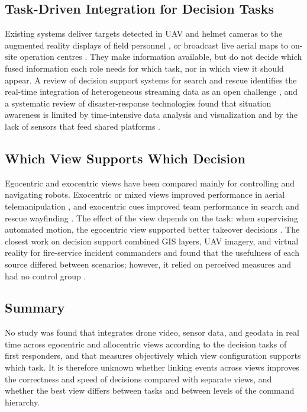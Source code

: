 \documentclass{article}
\begin{document}
\subsection{Task-Driven Integration for Decision Tasks}
Existing systems deliver targets detected in UAV and helmet cameras to the augmented reality displays of field personnel \cite{li2023visionice}, or broadcast live aerial maps to on-site operation centres \cite{hein2019realtime}.
They make information available, but do not decide which fused information each role needs for which task, nor in which view it should appear.
A review of decision support systems for search and rescue identifies the real-time integration of heterogeneous streaming data as an open challenge \cite{soularidis2024semantic}, and a systematic review of disaster-response technologies found that situation awareness is limited by time-intensive data analysis and visualization and by the lack of sensors that feed shared platforms \cite{kedia2020sa}.

\subsection{Which View Supports Which Decision}
Egocentric and exocentric views have been compared mainly for controlling and navigating robots.
Exocentric or mixed views improved performance in aerial telemanipulation \cite{young2021interface}, and exocentric cues improved team performance in search and rescue wayfinding \cite{xu2024arsar}.
The effect of the view depends on the task: when supervising automated motion, the egocentric view supported better takeover decisions \cite{larson2026viewpoint}.
The closest work on decision support combined GIS layers, UAV imagery, and virtual reality for fire-service incident commanders and found that the usefulness of each source differed between scenarios; however, it relied on perceived measures and had no control group \cite{hancko2026c2}.

\subsection{Summary}
No study was found that integrates drone video, sensor data, and geodata in real time across egocentric and allocentric views according to the decision tasks of first responders, and that measures objectively which view configuration supports which task.
It is therefore unknown whether linking events across views improves the correctness and speed of decisions compared with separate views, and whether the best view differs between tasks and between levels of the command hierarchy.
\end{document}
